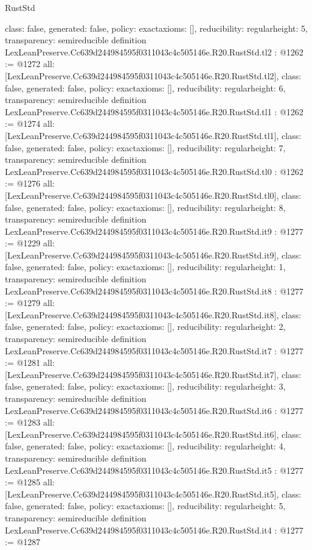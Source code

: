 \begin{lexlean}{RustStd}
\begin{coremodule}
{  class: false,
  generated: false,
  policy: exact{axioms: []},
  reducibility: regular{height: 5},
  transparency: semireducible
}
definition LexLeanPreserve.Cc639d244984595f0311043c4c505146e.R20.RustStd.tl2 : @1262 := @1272 {
  all: [LexLeanPreserve.Cc639d244984595f0311043c4c505146e.R20.RustStd.tl2],
  class: false,
  generated: false,
  policy: exact{axioms: []},
  reducibility: regular{height: 6},
  transparency: semireducible
}
definition LexLeanPreserve.Cc639d244984595f0311043c4c505146e.R20.RustStd.tl1 : @1262 := @1274 {
  all: [LexLeanPreserve.Cc639d244984595f0311043c4c505146e.R20.RustStd.tl1],
  class: false,
  generated: false,
  policy: exact{axioms: []},
  reducibility: regular{height: 7},
  transparency: semireducible
}
definition LexLeanPreserve.Cc639d244984595f0311043c4c505146e.R20.RustStd.tl0 : @1262 := @1276 {
  all: [LexLeanPreserve.Cc639d244984595f0311043c4c505146e.R20.RustStd.tl0],
  class: false,
  generated: false,
  policy: exact{axioms: []},
  reducibility: regular{height: 8},
  transparency: semireducible
}
definition LexLeanPreserve.Cc639d244984595f0311043c4c505146e.R20.RustStd.it9 : @1277 := @1229 {
  all: [LexLeanPreserve.Cc639d244984595f0311043c4c505146e.R20.RustStd.it9],
  class: false,
  generated: false,
  policy: exact{axioms: []},
  reducibility: regular{height: 1},
  transparency: semireducible
}
definition LexLeanPreserve.Cc639d244984595f0311043c4c505146e.R20.RustStd.it8 : @1277 := @1279 {
  all: [LexLeanPreserve.Cc639d244984595f0311043c4c505146e.R20.RustStd.it8],
  class: false,
  generated: false,
  policy: exact{axioms: []},
  reducibility: regular{height: 2},
  transparency: semireducible
}
definition LexLeanPreserve.Cc639d244984595f0311043c4c505146e.R20.RustStd.it7 : @1277 := @1281 {
  all: [LexLeanPreserve.Cc639d244984595f0311043c4c505146e.R20.RustStd.it7],
  class: false,
  generated: false,
  policy: exact{axioms: []},
  reducibility: regular{height: 3},
  transparency: semireducible
}
definition LexLeanPreserve.Cc639d244984595f0311043c4c505146e.R20.RustStd.it6 : @1277 := @1283 {
  all: [LexLeanPreserve.Cc639d244984595f0311043c4c505146e.R20.RustStd.it6],
  class: false,
  generated: false,
  policy: exact{axioms: []},
  reducibility: regular{height: 4},
  transparency: semireducible
}
definition LexLeanPreserve.Cc639d244984595f0311043c4c505146e.R20.RustStd.it5 : @1277 := @1285 {
  all: [LexLeanPreserve.Cc639d244984595f0311043c4c505146e.R20.RustStd.it5],
  class: false,
  generated: false,
  policy: exact{axioms: []},
  reducibility: regular{height: 5},
  transparency: semireducible
}
definition LexLeanPreserve.Cc639d244984595f0311043c4c505146e.R20.RustStd.it4 : @1277 := @1287 {
}
\end{coremodule}
\end{lexlean}
